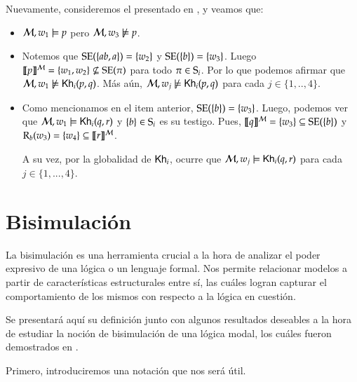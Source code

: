 \begin{ejemplo}
    Nuevamente, consideremos el \ults presentado en , y veamos que:
    \begin{itemize}
        \item $\modults,w_1 \models p$ pero $\modults,w_3 \not\models p$.
        \item Notemos que $\sexec(\{ab,a\}) = \{w_2\}$ y $\sexec(\{b\}) = \{w_3\}$. 
        Luego $\truthset{\modults}{p} = \{w_1,w_2\} \not\subseteq \sexec(\pi)$ para todo $\pi \in \S_i$.
        Por lo que podemos afirmar que $\modults,w_1 \not\models \khi(p,q)$.
        Más aún, $\modults,w_j \not\models \khi(p,q)$ para cada $j \in \{1,..,4\}$.
        \item Como mencionamos en el item anterior, $\sexec(\{b\}) = \{w_3\}$. Luego, podemos ver que 
        $\modults, w_1 \models \khi(q,r)$ y $\{b\} \in \S_i$ es su testigo. 
        Pues, $\truthset{\modults}{q} = \{w_3\} \subseteq \sexec(\{b\})$ y $\R_b(w_3) = \{w_4\} \subseteq \truthset{\modults}{r}$.         

        A su vez, por la globalidad de $\khi$, ocurre que $\modults,w_j \models \khi(q,r)$ para cada $j \in \{1,...,4\}$.
    \end{itemize}
\end{ejemplo}



\section{Bisimulación}

La bisimulación es una herramienta crucial a la hora de analizar el poder expresivo de una lógica o un lenguaje formal. 
Nos permite relacionar modelos a partir de características estructurales entre sí, las cuáles logran capturar el comportamiento de 
los mismos con respecto a la lógica en cuestión. 

Se presentará aquí su definición junto con algunos resultados deseables a la hora de estudiar la noción de bisimulación de una 
lógica modal, los cuáles fueron demostrados en \cite{ArecesFSV25,SaraviaPHD}.

Primero, introduciremos una notación que nos será útil.

